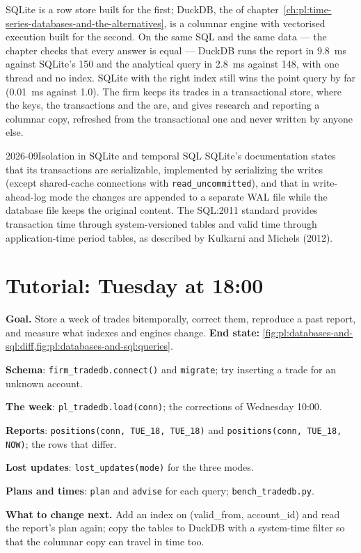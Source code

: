 SQLite is a row store built for the first; DuckDB, the  of chapter~\ref{ch:pl:time-series-databases-and-the-alternatives},
is a columnar engine with vectorised execution built for the second. On the same SQL and the same data --- the chapter checks that every
answer is equal --- DuckDB runs the report in 9.8~ms against SQLite's 150 and the analytical query in 2.8~ms against 148, with one thread and no
index. SQLite with the right index still wins the point query by far (0.01~ms against 1.0). The firm keeps its trades in a transactional
store, where the keys, the transactions and the  are, and gives research and reporting a columnar copy, refreshed from the
transactional one and never written by anyone else.

\begin{dated}{2026-09}{Isolation in SQLite and temporal SQL}\label{dat:pl:databases-and-sql:temporal}
SQLite's documentation states that its transactions are serializable, implemented by serializing the writes (except shared-cache connections
with \texttt{read\_uncommitted}), and that in write-ahead-log mode the changes are appended to a separate WAL file while the database file keeps
the original content. The SQL:2011 standard provides transaction time through system-versioned tables and valid time through application-time
period tables, as described by Kulkarni and Michels (2012).
\end{dated}

\section{Tutorial: Tuesday at 18:00}\label{tut:pl:databases-and-sql:tut}

\begin{tutorial}
\textbf{Goal.} Store a week of trades bitemporally, correct them, reproduce a past report, and measure what indexes and engines change.
\textbf{End state:} \cref{fig:pl:databases-and-sql:diff,fig:pl:databases-and-sql:queries}.
\begin{tutsteps}
\item \textbf{Schema}: \texttt{firm\_tradedb.connect()} and \texttt{migrate}; try inserting a trade for an unknown account.
\item \textbf{The week}: \texttt{pl\_tradedb.load(conn)}; the corrections of Wednesday 10:00.
\item \textbf{Reports}: \texttt{positions(conn, TUE\_18, TUE\_18)} and \texttt{positions(conn, TUE\_18, NOW)}; the rows that differ.
\item \textbf{Lost updates}: \texttt{lost\_updates(mode)} for the three modes.
\item \textbf{Plans and times}: \texttt{plan} and \texttt{advise} for each query; \texttt{bench\_tradedb.py}.
\end{tutsteps}
\textbf{What to change next.} Add an index on (valid\_from, account\_id) and read the report's plan again; copy the tables to DuckDB with a
system-time filter so that the columnar copy can travel in time too.
\end{tutorial}

